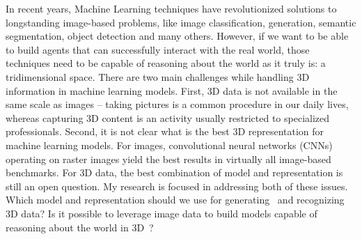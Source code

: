 

\eg
In recent years, Machine Learning techniques have revolutionized solutions to longstanding image-based
problems, like image classification, generation, semantic segmentation, object detection and many others.
However, if we want to be able to build agents that can successfully interact with the real world,
those techniques need to be capable of reasoning about the world as it truly is: a tridimensional space.
There are two main challenges while handling 3D information in machine learning models.
First, 3D data is not available in the same scale as images -- taking pictures is a common procedure in
our daily lives, whereas capturing 3D content is an activity usually restricted to specialized
professionals.
Second, it is not clear what is the best 3D representation for machine learning models.
For images, convolutional neural networks (CNNs) operating on raster images yield the best results in
virtually all image-based benchmarks.
For 3D data, the best combination of model and representation is still an open question.
My research is focused in addressing both of these issues.
Which model and representation should we use for generating~\cite{pcagan, mrt} and recognizing~\cite{shapeclassifiers, mrt} 3D data?
Is it possible to leverage image data to build models capable of reasoning about the world in 3D~\cite{gadelha19deepshape, prgan, prganpp}?

